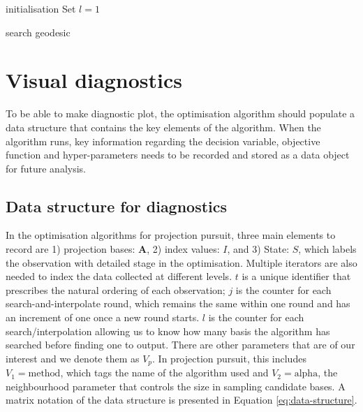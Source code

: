 \documentclass[12pt]{article}
\begin{document}
\begin{algorithm}
\SetAlgoLined
{}
  initialisation\;
  Set $l = 1$\;
  \caption{search geodesic}
  \label{search-geodesic}
\end{algorithm}

\hypertarget{vis-diag}{%
\section{Visual diagnostics}\label{vis-diag}}

To be able to make diagnostic plot, the optimisation algorithm should populate a data structure that contains the key elements of the algorithm. When the algorithm runs, key information regarding the decision variable, objective function and hyper-parameters needs to be recorded and stored as a data object for future analysis.

\hypertarget{data-structure-for-diagnostics}{%
\subsection{Data structure for diagnostics}\label{data-structure-for-diagnostics}}

In the optimisation algorithms for projection pursuit, three main elements to record are 1) projection bases: \(\mathbf{A}\), 2) index values: \(I\), and 3) State: \(S\), which labels the observation with detailed stage in the optimisation. Multiple iterators are also needed to index the data collected at different levels. \(t\) is a unique identifier that prescribes the natural ordering of each observation; \(j\) is the counter for each search-and-interpolate round, which remains the same within one round and has an increment of one once a new round starts. \(l\) is the counter for each search/interpolation allowing us to know how many basis the algorithm has searched before finding one to output. There are other parameters that are of our interest and we denote them as \emph{\(V_{p}\)}. In projection pursuit, this includes \(V_1 = \text{method}\), which tags the name of the algorithm used and \(V_2 = \text{alpha}\), the neighbourhood parameter that controls the size in sampling candidate bases. A matrix notation of the data structure is presented in Equation \ref{eq:data-structure}.
\end{document}
